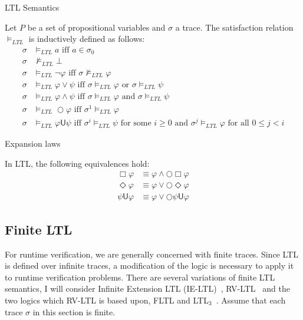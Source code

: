 \documentclass[a4paper]{article}
\newcommand{\U}{\mathsf{U}}
\newcommand{\tand}{\text{ and }}
\newcommand{\tor}{\text{ or }}
\newcommand{\tiff}{\text{ iff }}
\newcommand{\fsome}{\text{ for some }}
\newcommand{\fall}{\text{ for all }}
\begin{document}
\begin{defn}{LTL Semantics}\label{ltlsem}

  Let $P$ be a set of propositional variables and $\sigma$ a trace. The satisfaction relation $\vDash_{LTL}$ is inductively defined as follows:
\begin{align*}
  \sigma &\vDash_{LTL} a \tiff a \in \sigma_0\\
  \sigma &\nvDash_{LTL} \bot\\
  \sigma &\vDash_{LTL} \neg \varphi \tiff \sigma \nvDash_{LTL} \varphi\\
  \sigma &\vDash_{LTL} \varphi \lor \psi \tiff \sigma \vDash_{LTL} \varphi \tor \sigma \vDash_{LTL} \psi\\
  \sigma &\vDash_{LTL} \varphi \land \psi \tiff \sigma \vDash_{LTL} \varphi \tand \sigma \vDash_{LTL} \psi\\
  \sigma &\vDash_{LTL} \bigcirc \varphi \tiff \sigma^1 \vDash_{LTL} \varphi\\
  \sigma &\vDash_{LTL} \varphi \U \psi \tiff \sigma^i \vDash_{LTL} \psi \fsome i \geq 0 \tand \sigma^j \vDash_{LTL} \varphi \fall 0 \leq j < i
\end{align*}

\end{defn}

\begin{lem}{Expansion laws}\label{ltlexp}

  In LTL, the following equivalences hold:
  \begin{align}
    \Box \varphi &\equiv \varphi \land \bigcirc \Box \varphi\label{elbox}\\
    \Diamond \varphi &\equiv \varphi \lor \bigcirc \Diamond \varphi\label{eldiamond}\\
    \psi \U \varphi &\equiv \varphi \lor \bigcirc \psi \U \varphi\label{elU}
  \end{align}

\end{lem}



\subsection{Finite LTL}
For runtime verification, we are generally concerned with finite traces. Since LTL is defined over infinite traces, a modification of the logic is necessary to apply it to runtime verification problems. %
There are several variations of finite LTL semantics, I will consider Infinite Extension LTL (IE-LTL)~\autocite{rosu2005rewriting}, RV-LTL~\autocite{bauer2010comparing} and the two logics which RV-LTL is based upon, FLTL and LTL$_3$~\autocite{bauer2010comparing}.
Assume that each trace $\sigma$ in this section is finite.
\end{document}
